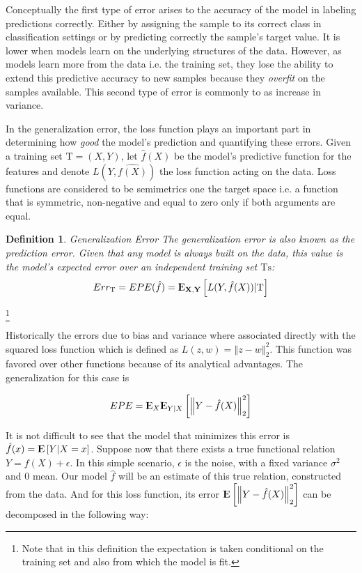 \documentclass{article}%
\newcommand{\Expect}{{\rm I\kern-.3em E}}
\newtheorem{definition}{Definition}[subsection]
\theoremstyle{definition}
\begin{document}
 Conceptually the first type of error arises to the accuracy of the model in labeling predictions correctly. Either by assigning the sample to its correct class in classification settings or by predicting correctly the sample's target value. It is lower when models learn on the underlying structures of the data. However, as models learn more from the data i.e. the training set, they lose the ability to extend this predictive accuracy to new samples because they \textit{overfit} on the samples available. This second type of error is commonly to as increase in variance.
 
 In the generalization error, the loss function plays an important part in determining how \textit{good} the model's prediction and quantifying these errors. Given a training set $\mathrm{T} = (X,Y)$, let $\hat{f}(X)$ be the model's predictive function for the features and denote $L( Y,\hat{f(X)} )$ the loss function acting on the data. Loss functions are considered to be semimetrics one the target space i.e. a function that is symmetric, non-negative and equal to zero only if both arguments are equal.
 
 
 \begin{definition}{Generalization Error}
 	The generalization error is also known as the prediction error. Given that any model is always built on the data, this value is the model's expected error over an independent training set $\mathrm{Ts}$:
 	$$ Err_{\mathrm{T}} =  EPE(\hat{f})= \Expect_{\textbf{X},\textbf{Y}} \left[ L(Y,\hat{f}(X)) |  \mathrm{T}\right]$$
 \end{definition}\footnote{Note that in this definition the expectation is taken conditional on the training set and also from which the model is fit.}
 
 Historically the errors due to bias and variance where associated directly with the squared loss function which is defined as $L(z,w) = \left\Vert z-w \right\Vert^2_2$. This function was favored over other functions because of its analytical advantages.  The generalization for this case is
 
 \begin{equation}\label{squaredEPE}
 EPE = \Expect_X \Expect_{Y|X} \left[ \left\Vert  Y - \hat{f}(X)  \right\Vert_2^2 \right]
 \end{equation}
 
 It is not difficult to see that the model that minimizes this error is $\hat{f}(x) = \Expect \left[ Y | X=x \right] $. Suppose now that there exists a true functional relation $Y = f(X) + \epsilon$. 
 In this simple scenario, $\epsilon$ is the noise, with a fixed variance $\sigma^2$ and $0$ mean. Our model $\hat{f}$ will be an estimate of this true relation, constructed from the data. And for this loss function, its error $\Expect \left[ \left\Vert Y  - \hat{f}(X) \right\Vert_2^2 \right]$ can be decomposed in the following way:
 
\end{document}
